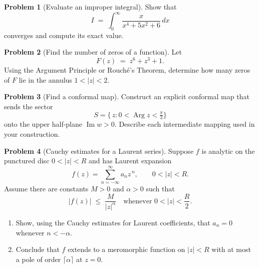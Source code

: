 \documentclass[12pt]{article}
\DeclareMathOperator{\Arg}{Arg}
\theoremstyle{definition} %
\newtheorem{problem}{Problem}
\theoremstyle{plain} %
\begin{document}
  \pagebreak
  
  \begin{problem}[Evaluate an improper integral]
  Show that
  \[
    I \;=\;\int_{0}^{\infty}\frac{x}{x^{4}+5x^{2}+6}\,dx
  \]
  converges and compute its exact value.
  \end{problem}
  
  \pagebreak
  
  \begin{problem}[Find the number of zeros of a function]
  Let
  \[
    F(z)\;=\;z^{6}+z^{3}+1.
  \]
  Using the Argument Principle or Rouché’s Theorem, determine how many zeros of \(F\) lie in the annulus \(1<\lvert z\rvert<2\).
  \end{problem}
  
  \pagebreak
  
  \begin{problem}[Find a conformal map]
  Construct an explicit conformal map that sends the sector
  \[
    S=\bigl\{\,z : 0<\Arg z<\tfrac{\pi}{3}\bigr\}
  \]
  onto the upper half‑plane \(\operatorname{Im}w>0\).  
  Describe each intermediate mapping used in your construction.
  \end{problem}
  
  \pagebreak
  
  \begin{problem}[Cauchy estimates for a Laurent series]
  Suppose \(f\) is analytic on the punctured disc \(0<\lvert z\rvert<R\) and has Laurent expansion
  \[
    f(z)=\sum_{n=-\infty}^{\infty}a_{n}z^{\,n}, \qquad 0<\lvert z\rvert<R.
  \]
  Assume there are constants \(M>0\) and \(\alpha>0\) such that
  \[
    \lvert f(z)\rvert \;\le\; \frac{M}{\lvert z\rvert^{\alpha}}
    \quad\text{whenever }0<\lvert z\rvert<\frac{R}{2}.
  \]
  \begin{enumerate}[label=(\alph*),itemsep=6pt]
    \item Show, using the Cauchy estimates for Laurent coefficients, that \(a_{n}=0\) whenever \(n<-\alpha\).
    \item Conclude that \(f\) extends to a meromorphic function on \(\lvert z\rvert<R\) with at most a pole of order \(\lceil\alpha\rceil\) at \(z=0\).
  \end{enumerate}
  \end{problem}
\end{document}
